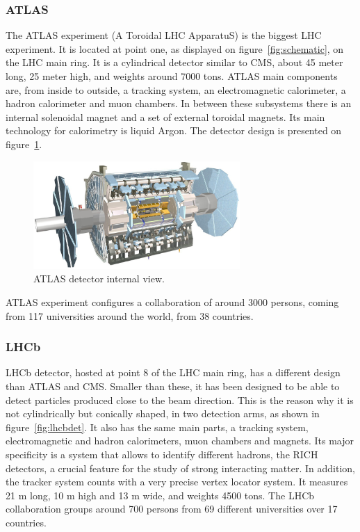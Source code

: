 \subsubsection{ATLAS}
\label{sec:atlas}

The ATLAS experiment (A Toroidal LHC ApparatuS) is the biggest LHC experiment. It is located at point one, as displayed on figure~\ref{fig:schematic}, on the LHC main ring. It is a cylindrical detector similar to CMS, about 45 meter long, 25 meter high, and weights around 7000 tons. ATLAS main components are, from inside to outside, a tracking system, an electromagnetic calorimeter, a hadron calorimeter and muon chambers. In between these subsystems there is an internal solenoidal magnet and a set of external toroidal magnets. Its main technology for calorimetry is liquid Argon. The detector design is presented on figure~\ref{fig:atlasdet}.

\begin{figure}[!Hhtbp]
  \begin{center}
    \includegraphics[width=0.7\textwidth]{figs/atlas_lg.jpg}
    \caption{ATLAS detector internal view. }
    \label{fig:atlasdet}
  \end{center}
\end{figure}

ATLAS experiment configures a collaboration of around 3000 persons, coming from 117 universities around the world, from 38 countries.

\subsubsection{LHCb}
\label{sec:lhcb}

LHCb detector, hosted at point 8 of the LHC main ring, has a different design than ATLAS and CMS. Smaller than these, it has been designed to be able to detect particles produced close to the beam direction. This is the reason why it is not cylindrically but conically shaped, in two detection arms, as shown in figure~\ref{fig:lhcbdet}. It also has the same main parts, a tracking system, electromagnetic and hadron calorimeters, muon chambers and magnets. Its major specificity is a system that allows to identify different hadrons, the RICH detectors, a crucial feature for the study of strong interacting matter. In addition, the tracker system counts with a very precise vertex locator system. It measures 21 m long, 10 m high and 13 m wide, and weights 4500 tons. The LHCb collaboration groups around 700 persons from 69 different universities over 17 countries. 

